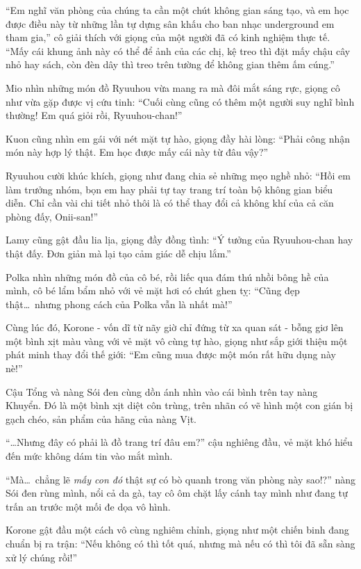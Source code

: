 \documentclass[../main.tex]{subfiles}
\begin{document}
``Em nghĩ văn phòng của chúng ta cần một chút không gian sáng tạo, và em học được điều này từ những lần tự dựng sân khấu cho ban nhạc underground em tham gia,'' cô giải thích với giọng của một người đã có kinh nghiệm thực tế. ``Mấy cái khung ảnh này có thể để ảnh của các chị, kệ treo thì đặt mấy chậu cây nhỏ hay sách, còn đèn dây thì treo trên tường để không gian thêm ấm cúng.''

Mio nhìn những món đồ Ryuuhou vừa mang ra mà đôi mắt sáng rực, giọng cô như vừa gặp được vị cứu tinh: ``Cuối cùng cũng có thêm một người suy nghĩ bình thường! Em quá giỏi rồi, Ryuuhou-chan!''

Kuon cũng nhìn em gái với nét mặt tự hào, giọng đầy hài lòng: ``Phải công nhận món này hợp lý thật. Em học được mấy cái này từ đâu vậy?''

Ryuuhou cười khúc khích, giọng như đang chia sẻ những mẹo nghề nhỏ: ``Hồi em làm trưởng nhóm, bọn em hay phải tự tay trang trí toàn bộ không gian biểu diễn. Chỉ cần vài chi tiết nhỏ thôi là có thể thay đổi cả không khí của cả căn phòng đấy, Onii-san!''

Lamy cũng gật đầu lia lịa, giọng đầy đồng tình: ``Ý tưởng của Ryuuhou-chan hay thật đấy. Đơn giản mà lại tạo cảm giác dễ chịu lắm.''

Polka nhìn những món đồ của cô bé, rồi liếc qua đám thú nhồi bông hề của mình, cô bé lẩm bẩm nhỏ với vẻ mặt hơi có chút ghen tỵ: ``Cũng đẹp thật\dots\ nhưng phong cách của Polka vẫn là nhất mà!''

Cùng lúc đó, Korone - vốn dĩ từ nãy giờ chỉ đứng từ xa quan sát - bỗng giơ lên một bình xịt màu vàng với vẻ mặt vô cùng tự hào, giọng như sắp giới thiệu một phát minh thay đổi thế giới: ``Em cũng mua được một món rất hữu dụng này nè!''

Cậu Tổng và nàng Sói đen cùng dồn ánh nhìn vào cái bình trên tay nàng Khuyển. Đó là một bình xịt diệt côn trùng, trên nhãn có vẽ hình một con gián bị gạch chéo, sản phẩm của hãng của nàng Vịt.

``\dots Nhưng đây có phải là đồ trang trí đâu em?'' cậu nghiêng đầu, vẻ mặt khó hiểu đến mức không dám tin vào mắt mình.

``Mà\dots\ chẳng lẽ \emph{mấy con đó} thật sự có bò quanh trong văn phòng này sao!?'' nàng Sói đen rùng mình, nổi cả da gà, tay cô ôm chặt lấy cánh tay mình như đang tự trấn an trước một mối đe dọa vô hình.

Korone gật đầu một cách vô cùng nghiêm chỉnh, giọng như một chiến binh đang chuẩn bị ra trận: ``Nếu không có thì tốt quá, nhưng mà nếu có thì tôi đã sẵn sàng xử lý chúng rồi!''
\end{document}
